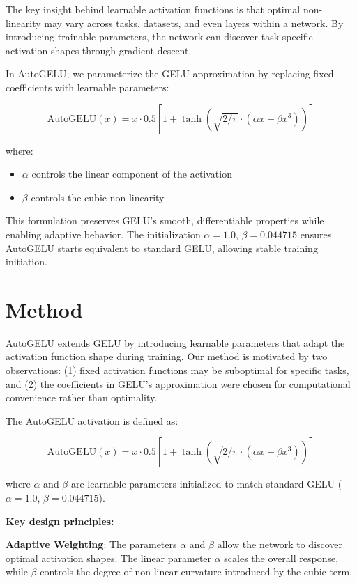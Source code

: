 \documentclass{article} %
\begin{document}
The key insight behind learnable activation functions is that optimal non-linearity may vary across tasks, datasets, and even layers within a network. By introducing trainable parameters, the network can discover task-specific activation shapes through gradient descent.

In AutoGELU, we parameterize the GELU approximation by replacing fixed coefficients with learnable parameters:

\begin{equation}
\text{AutoGELU}(x) = x \cdot 0.5[1 + \tanh(\sqrt{2/\pi} \cdot (\alpha x + \beta x^3))]
\end{equation}

where:
\begin{itemize}
\item $\alpha$ controls the linear component of the activation
\item $\beta$ controls the cubic non-linearity
\end{itemize}

This formulation preserves GELU's smooth, differentiable properties while enabling adaptive behavior. The initialization $\alpha=1.0$, $\beta=0.044715$ ensures AutoGELU starts equivalent to standard GELU, allowing stable training initiation.

\section{Method}

AutoGELU extends GELU by introducing learnable parameters that adapt the activation function shape during training. Our method is motivated by two observations: (1) fixed activation functions may be suboptimal for specific tasks, and (2) the coefficients in GELU's approximation were chosen for computational convenience rather than optimality.

The AutoGELU activation is defined as:

\begin{equation}
\text{AutoGELU}(x) = x \cdot 0.5[1 + \tanh(\sqrt{2/\pi} \cdot (\alpha x + \beta x^3))]
\end{equation}

where $\alpha$ and $\beta$ are learnable parameters initialized to match standard GELU ($\alpha=1.0$, $\beta=0.044715$).

\textbf{Key design principles:}

\textbf{Adaptive Weighting}: The parameters $\alpha$ and $\beta$ allow the network to discover optimal activation shapes. The linear parameter $\alpha$ scales the overall response, while $\beta$ controls the degree of non-linear curvature introduced by the cubic term.
\end{document}
